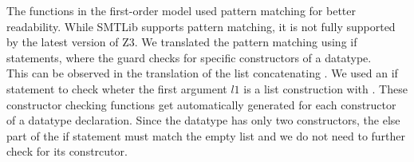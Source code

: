 The functions in the first-order model used pattern matching
for better readability. While SMTLib supports pattern matching,
it is not fully supported by the latest version of Z3.
We translated the pattern matching using if statements,
where the guard checks for specific constructors of a datatype.\\
This can be observed in the translation of the list concatenating .
We used an if statement to check wheter the first argument $l1$
is a list construction with .
These constructor checking functions get automatically
generated for each constructor of a datatype declaration.
Since the  datatype has only two constructors,
the else part of the if statement must match the empty list
and we do not need to further check for its constrcutor.

